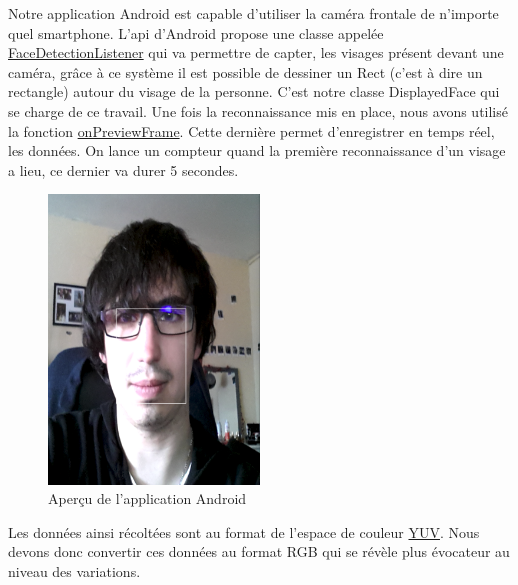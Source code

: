 Notre application Android est capable d'utiliser la caméra frontale de n'importe quel smartphone. L'api d'Android propose une classe appelée \href{http://developer.android.com/reference/android/hardware/Camera.FaceDetectionListener.html}{FaceDetectionListener} qui va permettre de
 capter, les visages présent devant une caméra, grâce à ce système il est possible de dessiner un Rect (c'est à dire un rectangle) autour du visage de la personne. C'est notre classe
  DisplayedFace qui se charge de ce travail.
Une fois la reconnaissance mis en place, nous avons utilisé la fonction
\href{http://developer.android.com/reference/android/hardware/Camera.PreviewCallback.html#onPreviewFrame\%28byte\%5B\%5D,\%20android.hardware.Camera\%29}{onPreviewFrame}. Cette dernière permet d'enregistrer
en temps réel, les données. On lance un compteur quand la première reconnaissance d'un visage a lieu, ce dernier va durer 5 secondes.\\

\begin{figure}[h!]
	\centering
	\includegraphics[width=0.5\textwidth]{data/appAndroid.png}
	\caption{Aperçu de l'application Android}
\end{figure}

Les données ainsi récoltées sont au format de l'espace de couleur \href{http://fr.wikipedia.org/wiki/YUV}{YUV}. Nous devons donc convertir ces données au format RGB qui se révèle plus évocateur au niveau des variations.

